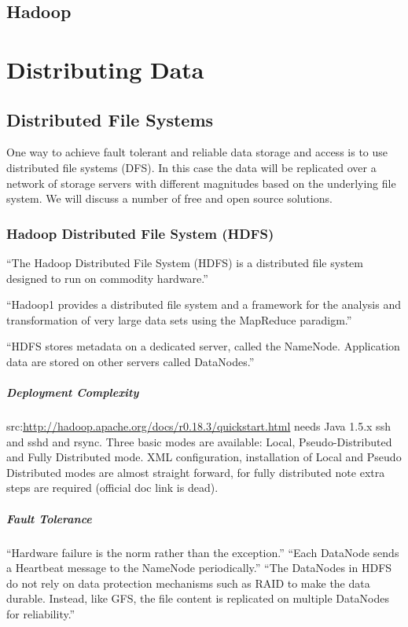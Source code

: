 \subsection{Hadoop}

\section{Distributing Data}
\subsection{Distributed File Systems}
One way to achieve fault tolerant and reliable data storage and access is to use
distributed file systems (DFS). In this case the data will be replicated over a
network of storage servers with different magnitudes based on the underlying file
system. We will discuss a number of free and open source solutions.

\subsubsection{Hadoop Distributed File System (HDFS)}
``The Hadoop Distributed File System (HDFS) is a distributed file system designed to run on
commodity hardware.'' \cite[tp.~3]{HDFSDocuments}

``Hadoop1 provides a distributed file system and a framework 
for the analysis and transformation of very large data sets 
using the MapReduce \cite{DG04} paradigm.''\cite{TheHDFS}

``HDFS stores metadata on a
dedicated server, called the NameNode. Application data are stored on
other servers called DataNodes.''\cite{TheHDFS}


\subparagraph{Deployment Complexity}
src:\url{http://hadoop.apache.org/docs/r0.18.3/quickstart.html}
needs Java 1.5.x ssh and sshd and rsync. Three basic modes are available:
Local, Pseudo-Distributed and Fully Distributed mode. XML configuration,
installation of Local and Pseudo Distributed modes are almost straight
forward, for fully distributed note extra steps are required (official
doc link is dead).


\subparagraph{Fault Tolerance}
``Hardware failure is the norm rather than the exception.''
``Each DataNode sends a Heartbeat message to the NameNode periodically.''
``The DataNodes in HDFS do not rely on data protection mechanisms 
such as RAID to make the data durable. Instead, like GFS, 
the file content is replicated on multiple DataNodes for reliability.''
\cite{TheHDFS}

